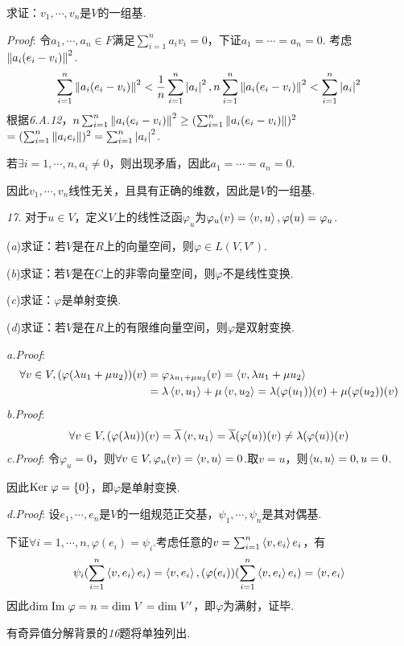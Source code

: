 求证：\(v_1,\cdots,v_n\)是\(V\)的一组基.

\textit{Proof}:
令\(a_1,\cdots,a_n \in F\)满足\(\sum_{i=1}^n a_iv_i=0\)，下证\(a_1=\cdots=a_n=0\).
考虑\(\left\lVert a_i(e_i-v_i) \right\rVert^2\).
    \begin{align*}
        \sum_{i=1}^n \left\lVert a_i(e_i-v_i) \right\rVert^2<\dfrac{1}{n}\sum_{i=1}^n \left\lvert a_i \right\rvert^2,
        n\sum_{i=1}^n \left\lVert a_i(e_i-v_i) \right\rVert^2<\sum_{i=1}^n \left\lvert a_i \right\rvert^2
    \end{align*}
根据\textit{6.A.12}，\(n\sum_{i=1}^n \left\lVert a_i(e_i-v_i) \right\rVert^2 \geq (\sum_{i=1}^n \left\lVert a_i(e_i-v_i) \right\rVert)^2\)
\(=(\sum_{i=1}^n \left\lVert a_ie_i \right\rVert)^2=\sum_{i=1}^n \left\lvert a_i \right\rvert^2\).

若\(\exists i=1,\cdots,n,a_i \ne 0\)，则出现矛盾，因此\(a_1=\cdots=a_n=0\).

因此\(v_1,\cdots,v_n\)线性无关，且具有正确的维数，因此是\(V\)的一组基.

\newpage

\textit{17.}
对于\(u \in V\)，定义\(V\)上的线性泛函\(\varphi_u\)为\(\varphi_u(v)=\left\langle v,u \right\rangle,\varphi(u)=\varphi_u\).

(\textit{a})求证：若\(V\)是在\(R\)上的向量空间，则\(\varphi \in L(V,V')\).

(\textit{b})求证：若\(V\)是在\(C\)上的非零向量空间，则\(\varphi\)不是线性变换.

(\textit{c})求证：\(\varphi\)是单射变换.

(\textit{d})求证：若\(V\)是在\(R\)上的有限维向量空间，则\(\varphi\)是双射变换.

\textit{a.Proof}:
    \begin{align*}
        \forall v \in V,(\varphi(\lambda u_1+\mu u_2))(v)
        &=\varphi_{\lambda u_1+\mu u_2}(v)=\left\langle v,\lambda u_1+\mu u_2 \right\rangle \\
        &=\lambda \left\langle v,u_1 \right\rangle+\mu \left\langle v,u_2 \right\rangle=\lambda (\varphi(u_1))(v)+\mu (\varphi(u_2))(v)
    \end{align*}
\textit{b.Proof}:
    \begin{align*}
        \forall v \in V,(\varphi(\lambda u))(v)=\overline{\lambda} \left\langle v,u_1 \right\rangle
        =\overline{\lambda} (\varphi(u))(v) \ne \lambda (\varphi(u))(v)
    \end{align*}
\textit{c.Proof}:
令\(\varphi_u=0\)，则\(\forall v \in V,\varphi_u(v)=\left\langle v,u \right\rangle=0\).取\(v=u\)，则\(\left\langle u,u \right\rangle=0,u=0\).

因此\(\mathrm{Ker \;} \varphi=\{0\}\)，即\(\varphi\)是单射变换.

\textit{d.Proof}:
设\(e_1,\cdots,e_n\)是\(V\)的一组规范正交基，\(\psi_1,\cdots,\psi_n\)是其对偶基.

下证\(\forall i=1,\cdots,n,\varphi(e_i)=\psi_i\).考虑任意的\(v=\sum_{i=1}^n \left\langle v,e_i \right\rangle e_i\)，有
    \begin{align*}
        \psi_i(\sum_{i=1}^n \left\langle v,e_i \right\rangle e_i)=\left\langle v,e_i \right\rangle,
        (\varphi(e_i))(\sum_{i=1}^n \left\langle v,e_i \right\rangle e_i)=\left\langle v,e_i \right\rangle
    \end{align*}
因此\(\mathrm{dim \;} \mathrm{Im \;} \varphi=n=\mathrm{dim \;} V=\mathrm{dim \;} V'\)，即\(\varphi\)为满射，证毕.

有奇异值分解背景的\textit{16}题将单独列出.

